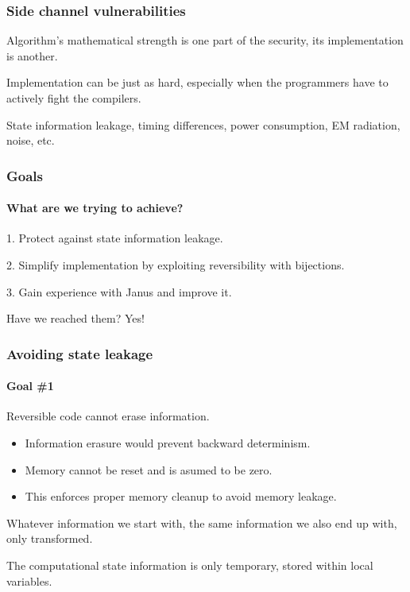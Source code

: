 \documentclass{beamer}
\begin{document}
\addtocounter{page}{1}
\begin{frame}
\addtocounter{page}{-1}
\frametitle{Side channel vulnerabilities}

\pause
\begin{block}{}
Algorithm's mathematical strength is one part of the security, its implementation is another.
\end{block}
\pause
\begin{block}{}
Implementation can be just as hard, especially when the programmers have to actively fight the compilers.
\end{block}

State information leakage, timing differences, power consumption, EM radiation, noise, etc.


\end{frame}


\addtocounter{page}{1}
\begin{frame}
\addtocounter{page}{-1}
\frametitle{Goals}
\framesubtitle{\hspace{5mm}What are we trying to achieve?} 

\pause
\begin{block}{}
1. Protect against state information leakage.
\end{block}

\pause
\begin{block}{}
2. Simplify implementation by exploiting reversibility with bijections.
\end{block}

\pause
\begin{block}{}
3. Gain experience with Janus and improve it.
\end{block}

\pause
Have we reached them?
\pause
Yes!

\end{frame}


\addtocounter{page}{1}
\begin{frame}
\addtocounter{page}{-1}
\frametitle{Avoiding state leakage}
\framesubtitle{\hspace{5mm}Goal \#1} 

\pause
\begin{block}{Reversible code cannot erase information.}
\begin{itemize}
\item Information erasure would prevent backward determinism.
\item Memory cannot be reset and is asumed to be zero.
\item This enforces proper memory cleanup to avoid memory leakage.
\end{itemize}
\end{block}

\pause

Whatever information we start with, the same information we also end up 
with, only transformed. 

\pause 
The computational state information is only temporary, stored within local variables.

\end{frame}
\end{document}
